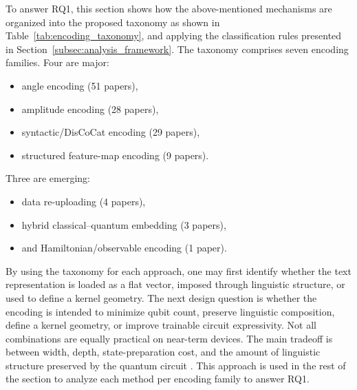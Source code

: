 \documentclass{ieeeaccess}
\begin{document}
To answer RQ1, this section shows how the above-mentioned mechanisms are organized into the proposed taxonomy as shown in Table~\ref{tab:encoding_taxonomy}, and applying the classification rules presented in Section~\ref{subsec:analysis_framework}.
The taxonomy comprises seven encoding families. 
Four are major: 
\begin{itemize}
    \item angle encoding (51 papers),
    \item amplitude encoding (28 papers),
    \item syntactic/DisCoCat encoding (29 papers),
    \item structured feature-map encoding (9 papers).
\end{itemize}
Three are emerging:
\begin{itemize}
    \item data re-uploading (4 papers), 
    \item  hybrid classical--quantum embedding (3 papers),
    \item  and Hamiltonian/observable encoding (1 paper).
\end{itemize}
By using the taxonomy for each approach, one may first identify whether the text representation is loaded as a flat vector, imposed through linguistic structure, or used to define a kernel geometry. The next design question is whether the encoding is intended to minimize qubit count, preserve linguistic composition, define a kernel geometry, or improve trainable circuit expressivity. Not all combinations are equally practical on near-term devices. The main tradeoff is between width, depth, state-preparation cost, and the amount of linguistic structure preserved by the quantum circuit \cite{preskill2018quantum,cerezo2021variational,ruskanda_evaluating_2025}. This approach is used in the rest of the section to analyze each method per encoding family to answer RQ1. 
\end{document}
